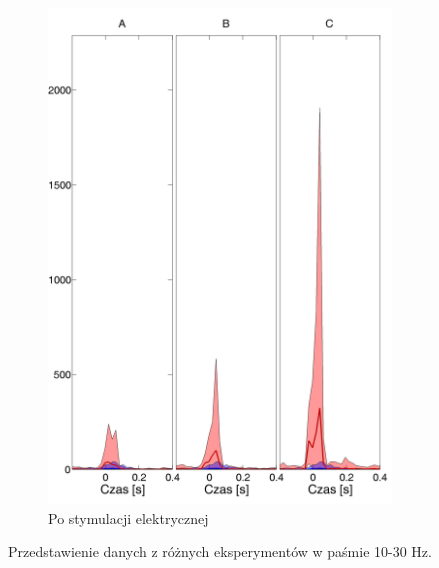 \documentclass{pracamgr}
\begin{document}
\begin{figure}[h]
\begin{subfigure}{.5\textwidth}
			\includegraphics[width=1.\linewidth]{beta3_10-30_z_CxC5_do_SC42.png}
			\caption{Po stymulacji elektrycznej}
			\label{rys:10_30_beta_CxC_SC}
		\end{subfigure}
		\caption{Przedstawienie danych z różnych eksperymentów w paśmie 10-30 Hz.}
		\label{rys:10_30_CxC_SC}
	\end{figure}
\end{document}
